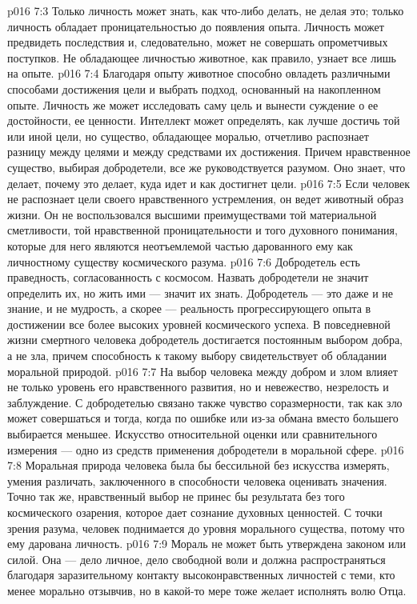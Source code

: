 \vs p016 7:3 Только личность может знать, как что\hyp{}либо делать, не делая это; только личность обладает проницательностью до появления опыта. Личность может предвидеть последствия и, следовательно, может не совершать опрометчивых поступков. Не обладающее личностью животное, как правило, узнает все лишь на опыте.
\vs p016 7:4 Благодаря опыту животное способно овладеть различными способами достижения цели и выбрать подход, основанный на накопленном опыте. Личность же может исследовать саму цель и вынести суждение о ее достойности, ее ценности. Интеллект может определять, как лучше достичь той или иной цели, но существо, обладающее моралью, отчетливо распознает разницу между целями и между средствами их достижения. Причем нравственное существо, выбирая добродетели, все же руководствуется разумом. Оно знает, что делает, почему это делает, куда идет и как достигнет цели.
\vs p016 7:5 Если человек не распознает цели своего нравственного устремления, он ведет животный образ жизни. Он не воспользовался высшими преимуществами той материальной сметливости, той нравственной проницательности и того духовного понимания, которые для него являются неотъемлемой частью дарованного ему как личностному существу космического разума.
\vs p016 7:6 \pc Добродетель есть праведность, согласованность с космосом. Назвать добродетели не значит определить их, но жить ими --- значит их знать. Добродетель --- это даже и не знание, и не мудрость, а скорее --- реальность прогрессирующего опыта в достижении все более высоких уровней космического успеха. В повседневной жизни смертного человека добродетель достигается постоянным выбором добра, а не зла, причем способность к такому выбору свидетельствует об обладании моральной природой.
\vs p016 7:7 На выбор человека между добром и злом влияет не только уровень его нравственного развития, но и невежество, незрелость и заблуждение. С добродетелью связано также чувство соразмерности, так как зло может совершаться и тогда, когда по ошибке или из\hyp{}за обмана вместо большего выбирается меньшее. Искусство относительной оценки или сравнительного измерения --- одно из средств применения добродетели в моральной сфере.
\vs p016 7:8 \pc Моральная природа человека была бы бессильной без искусства измерять, умения различать, заключенного в способности человека оценивать значения. Точно так же, нравственный выбор не принес бы результата без того космического озарения, которое дает сознание духовных ценностей. С точки зрения разума, человек поднимается до уровня морального существа, потому что ему дарована личность.
\vs p016 7:9 \pc Мораль не может быть утверждена законом или силой. Она --- дело личное, дело свободной воли и должна распространяться благодаря заразительному контакту высоконравственных личностей с теми, кто менее морально отзывчив, но в какой\hyp{}то мере тоже желает исполнять волю Отца.
